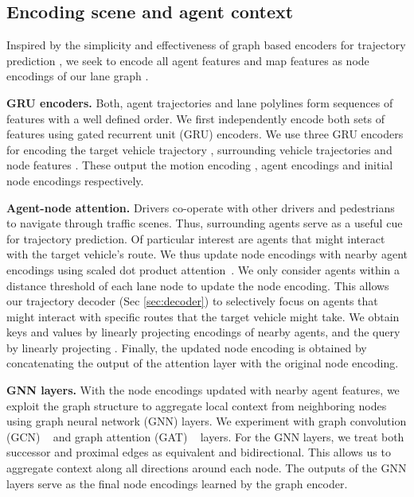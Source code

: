 \documentclass{article}
\begin{document}
\vspace{-2mm}
\subsection{Encoding scene and agent context}
\label{sec:encoder}
Inspired by the simplicity and effectiveness of graph based encoders for trajectory prediction \citep{gao2020vectornet, liang2020laneGcn}, we seek to encode all agent features and map features as node encodings of our lane graph . 

\textbf{GRU encoders.} Both, agent trajectories and lane polylines form sequences of features with a well defined order. We first independently encode both sets of features using gated recurrent unit (GRU) encoders. We use three GRU encoders for encoding the target vehicle trajectory , surrounding vehicle trajectories  and node features . These output the motion encoding , agent encodings  and initial node encodings  respectively.

\textbf{Agent-node attention.} 
Drivers co-operate with other drivers and pedestrians to navigate through traffic scenes. Thus, surrounding agents serve as a useful cue for trajectory prediction. Of particular interest are agents that might interact with the target vehicle's route. We thus update node encodings with nearby agent encodings using scaled dot product attention~\citep{vaswani2017attention}. We only consider agents within a distance threshold of each lane node to update the node encoding. This allows our trajectory decoder (Sec \ref{sec:decoder}) to selectively focus on agents that might interact with specific routes that the target vehicle might take. We obtain keys and values by linearly projecting encodings  of nearby agents, and the query by linearly projecting . Finally, the updated node encoding is obtained by concatenating the output of the attention layer with the original node encoding.





\textbf{GNN layers.} With the node encodings updated with nearby agent features, we exploit the graph structure to aggregate local context from neighboring nodes using graph neural network (GNN) layers. We experiment with graph convolution (GCN) ~\citep{kipf2016semi} and graph attention (GAT) ~\citep{velivckovic2017graph} layers. For the GNN layers, we treat both successor and proximal edges as equivalent and bidirectional. This allows us to aggregate context along all directions around each node. The outputs of the GNN layers serve as the final node encodings learned by the graph encoder.
\end{document}
